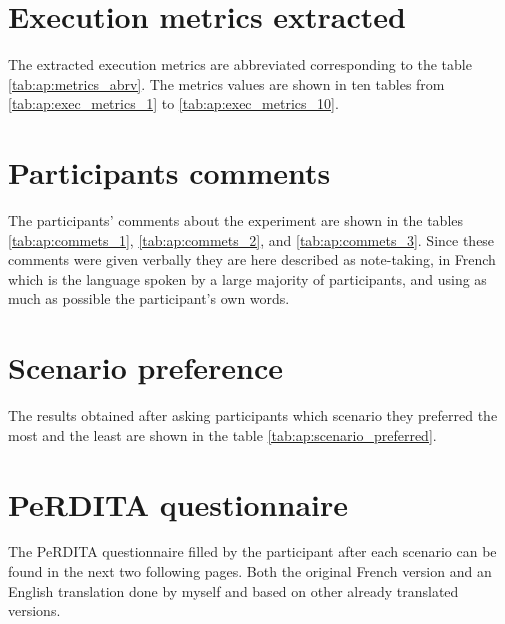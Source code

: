 \section{Execution metrics extracted}

The extracted execution metrics are abbreviated corresponding to the table \ref{tab:ap:metrics_abrv}. The metrics values are shown in ten tables from \ref{tab:ap:exec_metrics_1} to \ref{tab:ap:exec_metrics_10}. 


\section{Participants comments}

The participants' comments about the experiment are shown in the tables \ref{tab:ap:commets_1}, \ref{tab:ap:commets_2}, and \ref{tab:ap:commets_3}. Since these comments were given verbally they are here described as note-taking, in French which is the language spoken by a large majority of participants, and using as much as possible the participant's own words.

\section{Scenario preference}

The results obtained after asking participants which scenario they preferred the most and the least are shown in the table \ref{tab:ap:scenario_preferred}. 

\section{PeRDITA questionnaire}

The PeRDITA questionnaire filled by the participant after each scenario can be found in the next two following pages. Both the original French version and an English translation done by myself and based on other already translated versions. 




